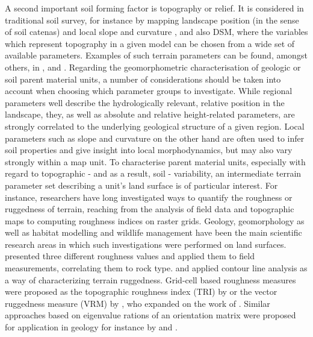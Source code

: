\documentclass[preprint,12pt,authoryear]{elsarticle}
\begin{document}
A second important soil forming factor is topography or relief. It is considered in traditional soil survey, for instance by mapping landscape position (in the sense of soil catenas) and local slope and curvature \citep{FAO2006}, and also DSM, where the variables which represent topography in a given model can be chosen from a wide set of available parameters. Examples of such terrain parameters can be found, amongst others, in \cite{Boehner2009}, \cite{Gallant2000} and \cite{Olaya2009141}. Regarding the geomorphometric characterisation of geologic or soil parent material units, a number of considerations should be taken into account when choosing which parameter groups to investigate. While regional parameters well describe the hydrologically relevant, relative position in the landscape, they, as well as absolute and relative height-related parameters, are strongly correlated to the underlying geological structure of a given region. Local parameters such as slope and curvature on the other hand are often used to infer soil properties and give insight into local morphodynamics, but may also vary strongly within a map unit. To characterise parent material units, especially with regard to topographic - and as a result, soil - variability, an intermediate terrain parameter set describing a unit's land surface is of particular interest. For instance, researchers have long investigated ways to quantify the roughness or ruggedness of terrain, reaching from the analysis of field data and topographic maps to computing roughness indices on raster grids. Geology, geomorphology as well as habitat modelling and wildlife management have been the main scientific research areas in which such investigations were performed on land surfaces.  \cite{Hobson1972} presented three different roughness values and applied them to field measurements, correlating them to rock type. \cite{Beasom1983} and \cite{Nellemann1994} applied contour line analysis as a way of characterizing terrain ruggedness. Grid-cell based roughness measures were proposed as the topographic roughness index (TRI) by  \cite{Riley1999} or the vector ruggedness measure (VRM) by \cite{Sappington2007}, who expanded on the work of \cite{Hobson1972}. Similar approaches based on eigenvalue rations of an orientation matrix were proposed for application in geology for instance by \cite{Woodcock1977} and \cite{Coblentz2014}.
\end{document}
